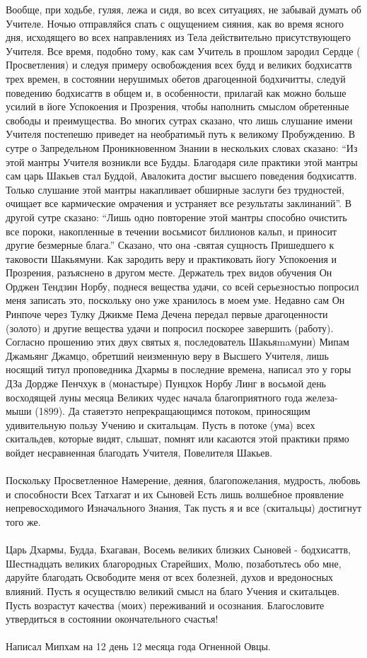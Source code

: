 Вообще, при ходьбе, гуляя, лежа и сидя, во всех ситуациях, не забывай думать об Учителе.
Ночью отправляйся спать с ощущением сияния, как во время ясного дня, исходящего
во всех направлениях из Тела действительно присутствующего Учителя. Все время,
подобно тому, как сам Учитель в прошлом зародил Сердце ( Просветления) и следуя
примеру освобождения всех будд и великих бодхисаттв трех времен, в состоянии
нерушимых обетов драгоценной бодхичитты, следуй поведению бодхисаттв в общем и,
в особенности, прилагай как можно больше усилий в йоге Успокоения и Прозрения,
чтобы наполнить смыслом обретенные свободы и преимущества.
Во многих сутрах сказано, что лишь слушание имени Учителя постепешю приведет
на необратимьй путь к великому Пробуждению. В сутре о Запредельном Проникновенном
Знании в нескольких словах сказано:
“Из этой мантры Учителя возникли все Будды. Благодаря силе практики этой мантры
сам царь Шакьев стал Буддой, Авалокита достиг высшего поведения бодхисаттв.
Только слушание этой мантры накапливает обширные заслуги без трудностей,
очищает все кармические омрачения и устраняет все результаты заклинаний”.
В другой сутре сказано: “Лишь одно повторение этой мантры способно очистить
все пороки, накопленные в течении восьмисот биллионов кальп, и приносит другие
безмерные блага.” Сказано, что она -святая сущность Пришедшего к таковости Шакьямуни.
Как зародить веру и практиковать йогу Успокоения и Прозрения, разъяснено в другом месте.
Держатель трех видов обучения Он Орджен Тендзин Норбу, поднеся вещества удачи,
со всей серьезностью попросил меня записать это, поскольку оно уже хранилось
в моем уме. Недавно сам Он Ринпоче через Тулку Джикме Пема Дечена передал
первые драгоценности (золото) и другие вещества удачи и попросил поскорее
завершить (работу). Согласно прошению этих двух святых я, последователь
Шакьяmaмуни) Мипам Джамьянг Джамцо, обретший неизменную веру в Высшего
Учителя, лишь носящий титул проповедника Дхармы в последние времена,
написал это у горы ДЗа Дордже Пенчхук в (монастыре) Пунцхок Норбу Линг
в восьмой день восходящей луны месяца Великих чудес начала благоприятного
года железа-мыши (1899). Да стаяетэто непрекращающимся потоком, приносящим
удивительную пользу Учению и скитальцам. Пусть в потоке (ума) всех скитальдев,
которые видят, слышат, помнят или касаются этой практики прямо войдет несравненная
благодать Учителя, Повелителя Шакьев.\\
\\
Поскольку Просветленное Намерение, деяния, благопожелания, мудрость, любовь и способности
Всех Татхагат и их Сыновей
Есть лишь волшебное проявление непревосходимого Изначального Знания,
Так пусть я и все (скитальцы) достигнут того же.\\
\\
Царь Дхармы, Будда, Бхагаван,
Восемь великих близких Сыновей - бодхисаттв,
Шестнадцать великих благородных Старейших,
Молю, позаботьтесь обо мне, даруйте благодать
Освободите меня от всех болезней, духов и вредоносных влияний.
Пусть я осуществлю великий смысл на благо Учения и скитальцев.
Пусть возрастут качества (моих) переживаний и осознания.
Благословите утвердиться в состоянии окончательного счастья!\\
\\
Написал Мипхам на 12 день 12 месяца года Огненной Овцы.
\footnotesize
